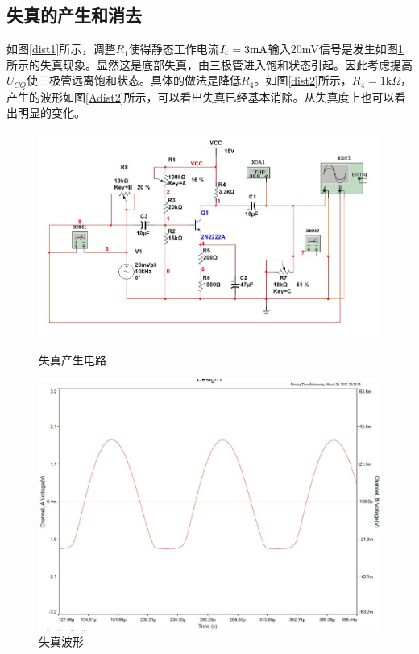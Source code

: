 \documentclass[UTF8,a4paper]{ctexart}
\begin{document}
\subsection{失真的产生和消去}
如图\ref{dist1}所示，调整$R_1$使得静态工作电流$I_c=3\rm{mA}$输入20mV信号是发生如图\ref{Adist1}所示的失真现象。显然这是底部失真，由三极管进入饱和状态引起。因此考虑提高$U_{CQ}$使三极管远离饱和状态。具体的做法是降低$R_4$。如图\ref{dist2}所示，$R_4=1\mathrm{k}\Omega$，产生的波形如图\ref{Adist2}所示，可以看出失真已经基本消除。从失真度上也可以看出明显的变化。
\begin{figure}
\centering
\includegraphics[width=\textwidth]{1-43mA3_3k.jpg}
\caption{失真产生电路}
\label{dist1}
\includegraphics[width=\textwidth]{1-42.jpg}
\caption{失真波形}
\label{Adist1} 
\end{figure}
\end{document}
